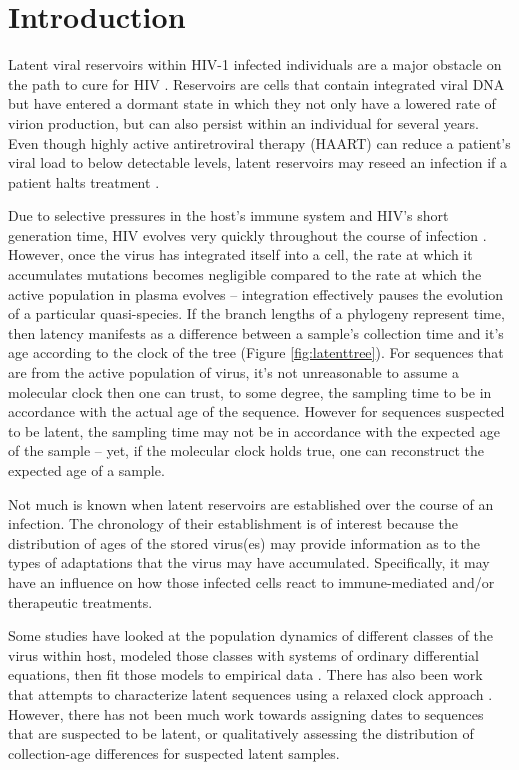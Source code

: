 \section{Introduction} \label{sec:intro}
Latent viral reservoirs within HIV-1 infected individuals are a major obstacle on the path to cure for HIV \citep{Pace11}. 
Reservoirs are cells that contain integrated viral DNA but have entered a dormant state in which they not only have a lowered rate of virion production, but can also persist within an individual for several years.
Even though highly active antiretroviral therapy (HAART) can reduce a patient's viral load to below detectable levels, latent reservoirs may reseed an infection if a patient halts treatment \citep{Joos08, Pomerantz03, Richman09}.


Due to selective pressures in the host's immune system and HIV's short generation time, HIV evolves very quickly throughout the course of infection \citep{Alizon13, Shankarappa99, Rambaut04}. 
However, once the virus has integrated itself into a cell, the rate at which it accumulates mutations becomes negligible compared to the rate at which the active population in plasma evolves -- integration effectively pauses the evolution of a particular quasi-species. 
If the branch lengths of a phylogeny represent time, then latency manifests as a difference between a sample's collection time and it's age according to the clock of the tree (Figure \ref{fig:latenttree}). 
For sequences that are from the active population of virus, it's not unreasonable to assume a molecular clock \citep{Leitner99, Kuhner95, Korber00} then one can trust, to some degree, the sampling time to be in accordance with the actual age of the sequence.
However for sequences suspected to be latent, the sampling time may not be in accordance with the expected age of the sample -- yet, if the molecular clock holds true, one can reconstruct the expected age of a sample.

Not much is known when latent reservoirs are established over the course of an infection. 
The chronology of their establishment is of interest because the distribution of ages of the stored virus(es) may provide information as to the types of adaptations that the virus may have accumulated. 
Specifically, it may have an influence on how those infected cells react to immune-mediated and/or therapeutic treatments. 

Some studies have looked at the population dynamics of different classes of the virus within host, modeled those classes with systems of ordinary differential equations, then fit those models to empirical data \citep{Althaus14}. 
There has also been work that attempts to characterize latent sequences using a relaxed clock approach \citep{Immonen14}. 
However, there has not been much work towards assigning dates to sequences that are suspected to be latent, or qualitatively assessing the distribution of collection-age differences for suspected latent samples.

